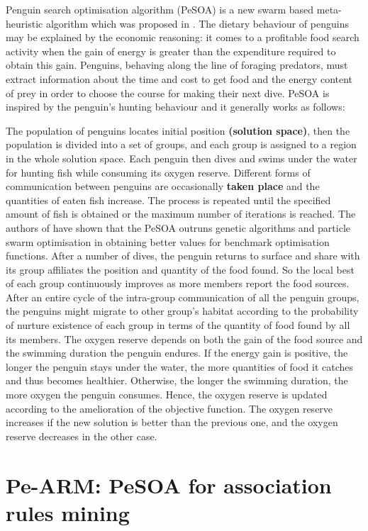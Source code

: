 \documentclass[preprint,12pt]{elsarticle}
\begin{document}
Penguin search optimisation algorithm (PeSOA) is a new swarm based meta-heuristic algorithm which was proposed in \cite{15}. The dietary behaviour of penguins may be explained by the economic reasoning: it comes to a profitable food search activity when the gain of energy is greater than the expenditure required to obtain this gain. Penguins, behaving along the line of foraging predators, must extract information about the time and cost to get food and the energy content of prey in order to choose the course for making their next dive.
 PeSOA is inspired by the penguin's hunting behaviour and it generally works as follows:
  
The population of penguins locates initial position \textbf{(solution space)}, then the population is divided into a set of groups, and each group is assigned to a region in the whole solution space. Each penguin then dives and swims under the water for hunting fish while consuming its oxygen reserve. Different forms of communication between penguins are occasionally \textbf{taken place} and the quantities of eaten fish increase. The process is repeated until the specified amount of fish is obtained or the maximum number of iterations is reached. The authors of \cite{15} have shown that the PeSOA outruns genetic algorithms and particle swarm optimisation in obtaining better values for benchmark optimisation functions. 
After a number of dives, the penguin returns to surface and share with its group affiliates the position and quantity of the food found. So the local best of each group continuously
 improves as more members report the food sources. After an entire cycle of the intra-group communication of all the penguin groups, the penguins might migrate to other group's habitat according to the probability of nurture existence of each group in terms of the quantity of food found by all its members.
The oxygen reserve depends on both the gain of the food source and the swimming duration the penguin endures. If the energy gain is positive, the longer the penguin stays under the water, the more quantities of food it catches and thus becomes healthier. Otherwise, the longer the swimming duration, the more oxygen the penguin consumes. Hence, the oxygen reserve is updated according to the amelioration of the objective function. The oxygen reserve increases if the new solution is better than the previous one, and the oxygen reserve decreases in the other case.

\section{Pe-ARM: PeSOA for association rules mining}
\end{document}
